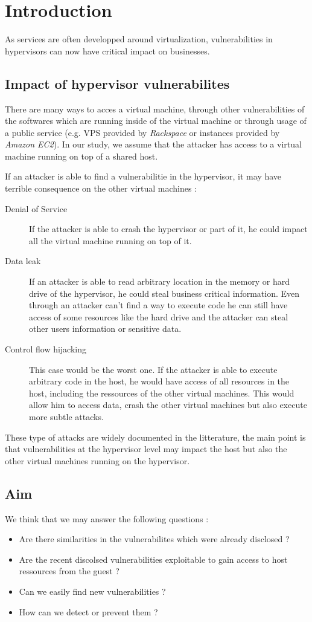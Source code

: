 \section{Introduction}
As services are often developped around virtualization, vulnerabilities in hypervisors can now
have critical impact on businesses.

\subsection{Impact of hypervisor vulnerabilites}
There are many ways to acces a virtual machine, through other vulnerabilities of
the softwares which are running inside of the virtual machine or through
usage of a public service (e.g. VPS provided by \emph{Rackspace} or instances
provided by \emph{Amazon EC2}).
In our study, we assume that the attacker has access to a virtual machine
running on top of a shared host.

If an attacker is able to find a vulnerabilitie in the hypervisor, it may have
terrible consequence on the other virtual machines :
\begin{description}
\item[Denial of Service] If the attacker is able to crash the hypervisor or part
of it, he could impact all the virtual machine running on top of it.
\item[Data leak] If an attacker is able to read arbitrary location in the memory
or hard drive of the hypervisor, he could steal business critical information.
Even through an attacker can't find a way to execute code he can still have
access of some resources like the hard drive and the attacker can steal
other users information or sensitive data.
\item[Control flow hijacking] This case would be the worst one. If the attacker
is able to execute arbitrary code in the host, he would have access of all
resources in the host, including the ressources of the other virtual machines.
This would allow him to access data, crash the other virtual machines but also
execute more subtle attacks.
\end{description}

These type of attacks are widely documented in the litterature, the main point is
that vulnerabilities at the hypervisor level may impact the host but also the other
virtual machines running on the hypervisor.

\subsection{Aim}
We think that we may answer the following questions :
\begin{itemize}
\item Are there similarities in the vulnerabilites which were already disclosed ?
\item Are the recent discolsed vulnerabilities exploitable to gain access to host
ressources from the guest ?
\item Can we easily find new vulnerabilities ?
\item How can we detect or prevent them ?
\end{itemize}

